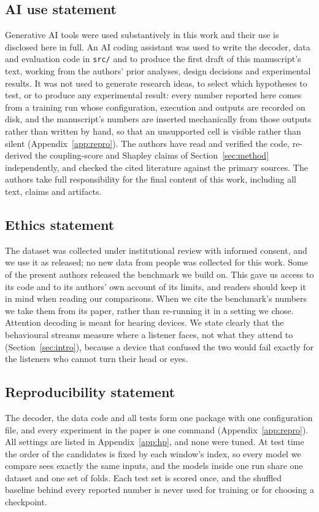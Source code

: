 \subsection*{AI use statement}

Generative AI tools were used substantively in this work and their use is
disclosed here in full. An AI coding assistant was used to write the decoder,
data and evaluation code in \texttt{src/} and to produce the first draft of this
manuscript's text, working from the authors' prior analyses, design decisions and
experimental results. It was not used to generate research ideas, to select which
hypotheses to test, or to produce any experimental result: every number reported
here comes from a training run whose configuration, execution and outputs are
recorded on disk, and the manuscript's numbers are inserted mechanically from
those outputs rather than written by hand, so that an unsupported cell is visible
rather than silent (Appendix~\ref{app:repro}). The authors have read and verified
the code, re-derived the coupling-score and Shapley claims of
Section~\ref{sec:method} independently, and checked the cited literature against the
primary sources. The authors take full responsibility for the final content of
this work, including all text, claims and artifacts.

\subsection*{Ethics statement}

The dataset was collected under institutional review with informed consent, and
we use it as released; no new data from people was collected for this work. Some
of the present authors released the benchmark we build on. This gave us access to
its code and to its authors' own account of its limits, and readers should keep
it in mind when reading our comparisons. When we cite the benchmark's numbers we
take them from its paper, rather than re-running it in a setting we chose.
Attention decoding is meant for hearing devices. We state clearly that the
behavioural streams measure where a listener faces, not what they attend to
(Section~\ref{sec:intro}), because a device that confused the two would fail
exactly for the listeners who cannot turn their head or eyes.

\subsection*{Reproducibility statement}

The decoder, the data code and all tests form one package with one configuration
file, and every experiment in the paper is one command (Appendix~\ref{app:repro}).
All settings are listed in Appendix~\ref{app:hp}, and none were tuned. At test
time the order of the candidates is fixed by each window's index, so every model
we compare sees exactly the same inputs, and the models inside one run share one
dataset and one set of folds. Each test set is scored once, and the shuffled
baseline behind every reported number is never used for training or for choosing
a checkpoint.
